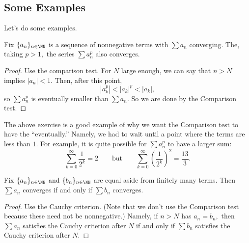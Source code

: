 \subsection{Some Examples}
Let's do some examples.
\begin{exercise}[Ross 14.7]
	Fix $\{a_n\}_{n\in\NN}$ is a sequence of nonnegative terms with $\sum a_n$ converging. The, taking $p>1,$ the series $\sum a_n^p$ also converges.
\end{exercise}
\begin{proof}
	Use the comparison test. For $N$ large enough, we can say that $n>N$ implies $|a_n|<1.$ Then, after this point,
	\[\left|a_k^p\right|<|a_k|^p<|a_k|,\]
	so $\sum a_n^p$ is eventually smaller than $\sum a_n.$ So we are done by the Comparison test.
\end{proof}
The above exercise is a good example of why we want the Comparison test to have the ``eventually.'' Namely, we had to wait until a point where the terms are less than $1.$ For example, it is quite possible for $\sum a_n^p$ to have a larger sum:
\[\sum_{k=0}^\infty\frac1{2^k}=2\qquad\text{but}\qquad\sum_{k=0}^\infty\left(\frac1{2^k}\right)^2=\frac{13}3.\]
\begin{exercise}[Ross 14.9]
	Fix $\{a_n\}_{n\in\NN}$ and $\{b_n\}_{n\in\NN}$ are equal aside from finitely many terms. Then $\sum a_n$ converges if and only if $\sum b_n$ converges.
\end{exercise}
\begin{proof}
	Use the Cauchy criterion. (Note that we don't use the Comparison test because these need not be nonnegative.) Namely, if $n>N$ has $a_n=b_n,$ then $\sum a_n$ satisfies the Cauchy criterion after $N$ if and only if $\sum b_n$ satisfies the Cauchy criterion after $N.$
\end{proof}

